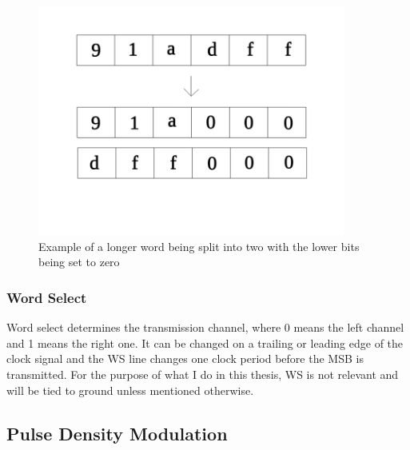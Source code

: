 \begin{figure}[htb]
    \centering
    \includegraphics[width=0.9\textwidth]{figures/fundamentals_truncation.png}
    \caption[Illustration: Truncation of words]{Example of a longer word being split into two with the lower bits being set to zero}
    \label{fig:truncation}
\end{figure}

\subsubsection{Word Select}

Word select determines the transmission channel, where 0 means the left channel and 1 means the right one.
It can be changed on a trailing or leading edge of the clock signal and the WS line changes one clock period
before the MSB is transmitted.
For the purpose of what I do in this thesis, WS is not relevant and will be tied to ground unless mentioned otherwise.

\subsection{Pulse Density Modulation}

